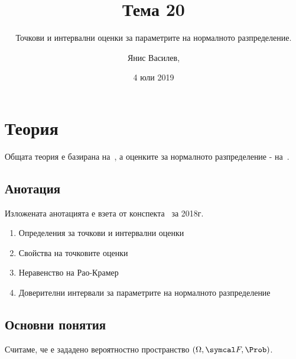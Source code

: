 \documentclass[numbers=endperiod, bibliography=totocnumbered]{scrartcl}
\title{Тема 20}
\subtitle{Точкови и интервални оценки за параметрите на нормалното разпределение.}
\author{Янис Василев, \Email{ianis@ivasilev.net}}
\date{4 юли 2019}
\begin{document}
\maketitle

\section{Теория}

Общата теория е базирана на~\cite{DimitrovYanev}, а оценките за нормалното разпределение - на~\cite{ASLectures}.

\subsection{Анотация}

Изложената анотацията е взета от конспекта~\cite{Syllabus} за 2018г.

\begin{enumerate}
  \item Определения за точкови и интервални оценки
  \item Свойства на точковите оценки
  \item Неравенство на Рао-Крамер
  \item Доверителни интервали за параметрите на нормалното разпределение
\end{enumerate}

\subsection{Основни понятия}

Считаме, че е зададено вероятностно пространство \( (\Omega, \F, \Prob) \).
\end{document}
